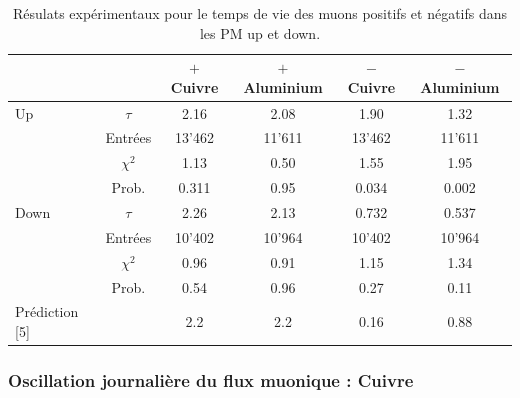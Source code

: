 \documentclass[12pt]{article}
\begin{document}
\begin{table}[htbp!]
  \centering
  \captionsetup{width=0.9\textwidth}
  \caption{Résulats expérimentaux pour le temps de vie des muons positifs et négatifs dans les PM up et down.}
  \begin{tabular}{lc|cccc}
     & & $+$ Cuivre  & $+$ Aluminium & $-$ Cuivre & $-$ Aluminium \\
    \hline
    Up &  $\tau$ & 2.16 & 2.08 & 1.90 & 1.32\\
    &Entrées & 13'462 & 11'611 & 13'462 & 11'611 \\
    & $\chi^{2}$ & 1.13 & 0.50 & 1.55 & 1.95\\
    & Prob. & 0.311 & 0.95 & 0.034 & 0.002\\
    \hline
    Down & $\tau$ & 2.26 & 2.13 & 0.732 & 0.537 \\
    &Entrées & 10'402 & 10'964  & 10'402 & 10'964\\
    &$\chi^{2}$ & 0.96 & 0.91 & 1.15 & 1.34 \\
    &Prob. & 0.54 & 0.96 & 0.27 & 0.11\\
    \hline
    Prédiction [5] & & 2.2 & 2.2 & 0.16 & 0.88 \\
    
\end{tabular}
\label{TauPositifNegatifComplet}
\end{table}

\newpage
\subsubsection{Oscillation journalière du flux muonique : Cuivre}
\end{document}
